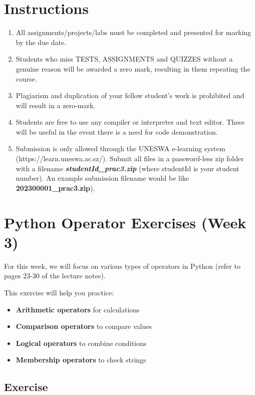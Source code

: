 \documentclass[a4paper,11pt]{article}
\theoremstyle{mytheor}
\begin{document}
\section*{Instructions} 
\begin{enumerate}
    \item All assignments/projects/labs must be completed and presented for marking by the due date. 
    \item Students who miss TESTS, ASSIGNMENTS and QUIZZES without a genuine reason will be awarded a zero mark, resulting in them repeating the course.
    \item Plagiarism and duplication of your fellow student's work is prohibited and will result in a zero-mark.
    \item Students are free to use any compiler or interpreter and text editor. These will be useful in the event there is a need for code demonstration. 
    \item Submission is only allowed through the UNESWA e-learning system (https://learn.uneswa.ac.sz/). Submit all files in a password-less zip folder with a filename \textbf{\textit{studentId\_prac3.zip}} (where studentId is your student number). An example submission filename would be like \textbf{202300001\_prac3.zip}).
\end{enumerate} 
  
\section*{Python Operator Exercises (Week 3)}

For this week, we will focus on various types of operators in Python (refer to pages 23-30 of the lecture notes).  

This exercise will help you practice:
\begin{itemize}
    \item \textbf{Arithmetic operators} for calculations
    \item \textbf{Comparison operators} to compare values
    \item \textbf{Logical operators} to combine conditions
    \item \textbf{Membership operators} to check strings
\end{itemize}

\subsection*{Exercise}
\end{document}
